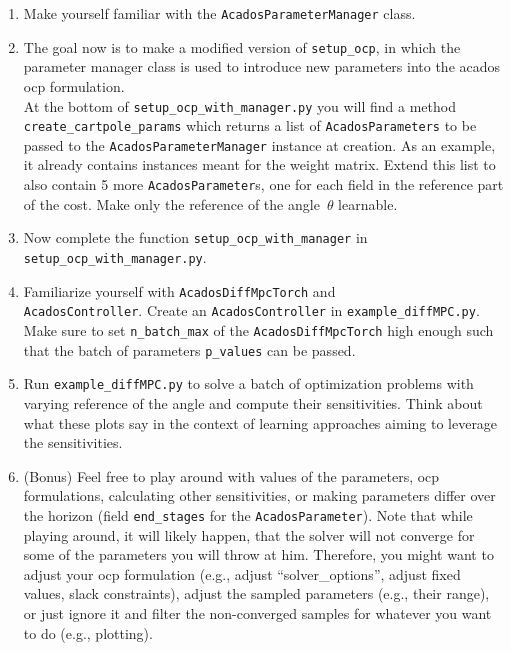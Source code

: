 \documentclass{article}
\begin{document}
\begin{enumerate}[label=2.\arabic*]
	\item Make yourself familiar with the
	\verb*|AcadosParameterManager| class.
	\item The goal now is to make a modified version of \verb*|setup_ocp|,
	in which the parameter manager class is used to introduce new parameters into the
	acados ocp formulation.\\
	At the bottom of \verb*|setup_ocp_with_manager.py| you will find a method
	\verb*|create_cartpole_params| which returns a list of \verb*|AcadosParameters| to
	be passed to the \verb*|AcadosParameterManager| instance at creation.
	As an example, it already contains instances meant for the weight matrix.
	Extend this list to also contain 5 more \texttt{AcadosParameter}s, one for each field in the
	reference part of the cost.
	Make only the reference of the angle~$\theta$ learnable.
	\item Now complete the function \verb*|setup_ocp_with_manager|
	in \verb*|setup_ocp_with_manager.py|.
	\item Familiarize yourself with \verb*|AcadosDiffMpcTorch| and \\
	\verb*|AcadosController|.
	Create an \verb*|AcadosController| in \verb*|example_diffMPC.py|.
	Make sure to set \verb*|n_batch_max| of the \verb*|AcadosDiffMpcTorch| high enough
	such that the batch of parameters \verb*|p_values| can be passed.
	\item Run \verb*|example_diffMPC.py| to solve a batch
	of optimization problems with varying reference of the angle and compute their sensitivities.
	Think about what these plots say in the context of learning approaches aiming to leverage the sensitivities.
	\item (Bonus) Feel free to play around with values of the parameters, ocp formulations,
	calculating other sensitivities, or making parameters differ over the horizon 
	(field \verb*|end_stages| for the \verb|AcadosParameter|).
	Note that while playing around, it will likely happen, that the solver will not converge for some of the parameters you will throw at him.
	Therefore, you might want to adjust your ocp formulation (e.g., adjust ``solver\_options'', adjust fixed values, slack constraints),
	adjust the sampled parameters (e.g., their range), 
	or just ignore it and filter the non-converged samples for whatever you want to do (e.g., plotting).

\end{enumerate}
\end{document}

